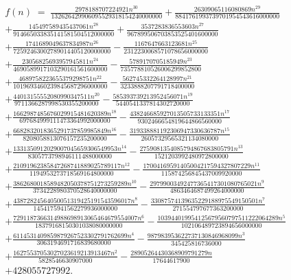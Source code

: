\documentclass[11pt,a4paper]{article}
\theoremstyle{plain}
\theoremstyle{definition}
\begin{document}
\begin{multline*}
f(n)\;=\;\frac{2978188707224921 n^{30}}{132626429906095529318154240000000} + \frac{26309065116080869 n^{29}}{8841761993739701954543616000000} \\
+ \frac{145497589435437061 n^{28}}{914665033835141581504512000000} + \frac{3537283836553603 n^{27}}{967899506703853525401600000} \\
+ \frac{1741689049637834987 n^{26}}{72592463002789014405120000000} - \frac{1167647663123681 n^{25}}{2312230068571078656000000} \\
+ \frac{23056825693957945811 n^{24}}{4690589917103290161561600000} - \frac{5789170705185949 n^{23}}{735778810526006299852800} \\
+ \frac{4689758223655379298751 n^{22}}{1019693460239845687296000000} - \frac{562745332264128997 n^{21}}{3233888207791718400000} \\
+ \frac{44013155552080990347511 n^{20}}{9711366287998530355200000} - \frac{585393739213952456071 n^{19}}{5440541337814302720000} \\
+ \frac{1662987485676029915481620389 n^{18}}{697684999111473364992000000} - \frac{438246685927013505733133351 n^{17}}{9302466654819644866560000} \\
+ \frac{6682832018365291737859985849 n^{16}}{8208058813076157235200000} - \frac{319338881192306947330636787 n^{15}}{26057329565321134080000} \\
+ \frac{1331350912029007045659306549953 n^{14}}{8305773798946111488000000} - \frac{2759081354085794867683805791 n^{13}}{1521203992480972800000} \\
+ \frac{21091962385847268741889025789117 n^{12}}{1194953273718569164800000} - \frac{17004169591405004217594327807229 n^{11}}{115874256845437009920000} \\
+ \frac{3862680018589482050378751273259289 n^{10}}{3734228980370528640000000} - \frac{29799003492477365417301080765021 n^{9}}{4863464687499264000000} \\
+ \frac{43872824564050051319425191543596017 n^{8}}{1454175941562279936000000} - \frac{33087574139635229188975549150501 n^{7}}{271554797677363200000} \\
+ \frac{7291187366314988698913065464679554007 n^{6}}{18379168150301038080000000} - \frac{103944019954125679560797511222064289 n^{5}}{102106489723894656000000} \\
+ \frac{6114531409859879267523302791762699 n^{4}}{3063194691716839680000} - \frac{987983953622737130846968099 n^{3}}{345425816736000} \\
+ \frac{16275537053027023619213913467 n^{2}}{5828546630907000} - \frac{28905264430368909791279 n}{17644617900} \\
+ 428055727992.
\end{multline*}
\end{document}
